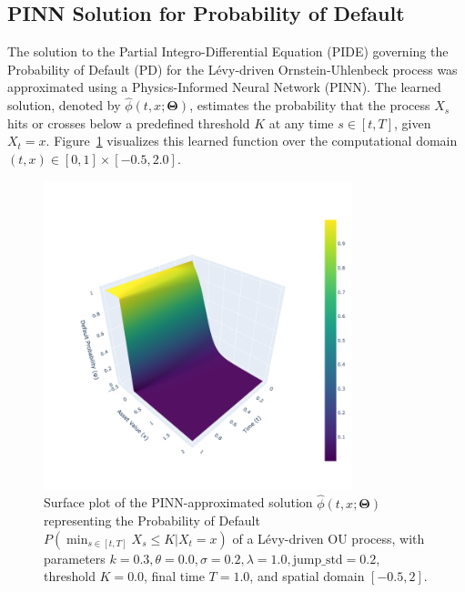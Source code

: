 \documentclass[11pt,twoside,openright]{report}
\begin{document}
\subsection{PINN Solution for Probability of Default}
\label{sec:pinn_pd_solution_results} %

The solution to the Partial Integro-Differential Equation (PIDE) governing the Probability of Default (PD) for the Lévy-driven Ornstein-Uhlenbeck process was approximated using a Physics-Informed Neural Network (PINN). The learned solution, denoted by $\hat{\phi}(t, x; \mathbf{\Theta})$, estimates the probability that the process $X_s$ hits or crosses below a predefined threshold $K$ at any time $s \in [t, T]$, given $X_t = x$. Figure~\ref{fig:pinn_levy_ou_pd_solution} visualizes this learned function over the computational domain $(t, x) \in [0, 1] \times [-0.5, 2.0]$.

\begin{figure}[htbp]
    \centering
    \includegraphics[width=0.8\textwidth]{Figures/pinn_3d_stable_data.png} %
    \caption{Surface plot of the PINN-approximated solution $\hat{\phi}(t, x; \mathbf{\Theta})$ representing the Probability of Default $P(\min_{s \in [t, T]} X_s \le K | X_t = x)$ of a Lévy-driven OU process, with parameters $k=0.3, \theta=0.0, \sigma=0.2, \lambda=1.0, \text{jump\_std}=0.2$, threshold $K=0.0$, final time $T=1.0$, and spatial domain $[-0.5, 2]$.}
    \label{fig:pinn_levy_ou_pd_solution} %
\end{figure}
\end{document}

